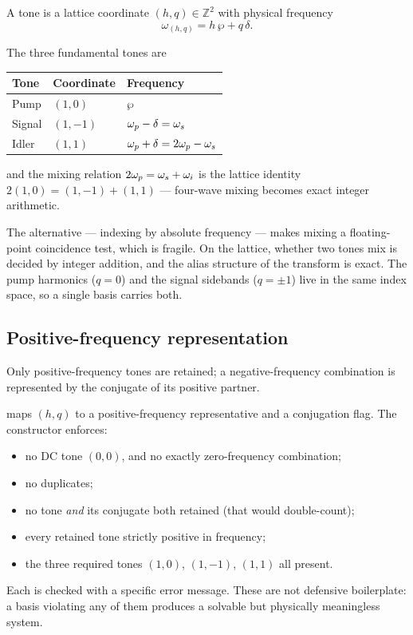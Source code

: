 \begin{definition}
A tone is a lattice coordinate $(h,q)\in\mathbb{Z}^{2}$ with physical frequency
\begin{equation}
  \boxed{\;\omega_{(h,q)} = h\,\wp + q\,\delta .\;}
  \label{eq:tone-frequency}
\end{equation}
\end{definition}

The three fundamental tones are
\begin{center}
\begin{tabular}{@{}l l l@{}}
\toprule
Tone & Coordinate & Frequency \\
\midrule
Pump   & $(1,0)$  & $\wp$ \\
Signal & $(1,-1)$ & $\omega_{p} - \delta = \omega_{s}$ \\
Idler  & $(1,1)$  & $\omega_{p} + \delta = 2\omega_{p} - \omega_{s}$ \\
\bottomrule
\end{tabular}
\end{center}
and the mixing relation $2\omega_{p} = \omega_{s} + \omega_{i}$ is the lattice identity
$2(1,0) = (1,-1) + (1,1)$ --- four-wave mixing becomes exact integer arithmetic.

\begin{remark}
The alternative --- indexing by absolute frequency --- makes mixing a
floating-point coincidence test, which is fragile. On the lattice, whether two
tones mix is decided by integer addition, and the alias structure of the
transform is exact. The pump harmonics ($q=0$) and the signal sidebands
($q=\pm1$) live in the same index space, so a single basis carries both.
\end{remark}

\subsection{Positive-frequency representation}

Only positive-frequency tones are retained; a negative-frequency combination is
represented by the conjugate of its positive partner.

\begin{implnote}
 maps $(h,q)$ to a positive-frequency representative and a
conjugation flag. The  constructor enforces:
\begin{itemize}
\item no DC tone $(0,0)$, and no exactly zero-frequency combination;
\item no duplicates;
\item no tone \emph{and} its conjugate both retained (that would double-count);
\item every retained tone strictly positive in frequency;
\item the three required tones $(1,0)$, $(1,-1)$, $(1,1)$ all present.
\end{itemize}
Each is checked with a specific error message. These are not defensive
boilerplate: a basis violating any of them produces a solvable but physically
meaningless system.
\end{implnote}

